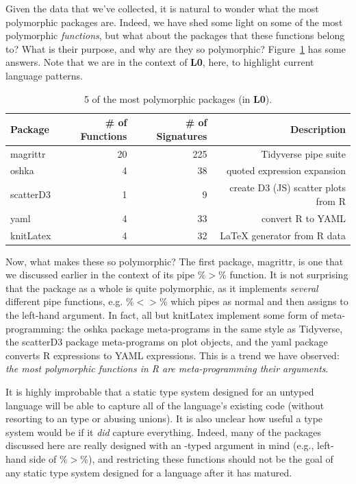 \documentclass[acmsmall,10pt,review,anonymous]{acmart}\settopmatter{printfolios=true,printccs=false,printacmref=false}
\begin{document}
Given the data that we've collected, it is natural to wonder what the most polymorphic packages are.
Indeed, we have shed some light on some of the most polymorphic {\it functions}, but what about the packages that these functions belong to?
What is their purpose, and why are they so polymorphic?
Figure~\ref{tab:packagepolysize} has some answers.
Note that we are in the context of {\bf L0}, here, to highlight current language patterns.

\begin{table}[ht]
\centering
\begin{tabular}{lrrr}
  \hline
  Package & \# of Functions &\# of Signatures & Description \\ 
  \hline
  magrittr & 20 & 225 & Tidyverse pipe suite \\ 
  oshka & 4 & 38 & quoted expression expansion \\ 
  scatterD3 & 1 & 9 & create D3 (JS) scatter plots from R \\ 
  yaml & 4 & 33 & convert R to YAML \\ 
  knitLatex & 4 & 32 & \LaTeX \xspace generator from R data \\ 
   \hline
\end{tabular}
\caption{5 of the most polymorphic packages (in {\bf L0}).}
\label{tab:packagepolysize}
\end{table}

Now, what makes these so polymorphic?
The first package, magrittr, is one that we discussed earlier in the context of its pipe \%$>$\% function. 
It is not surprising that the package as a whole is quite polymorphic, as it implements {\it several} different pipe functions, e.g. \%$<>$\% which pipes as normal and then assigns to the left-hand argument.
In fact, all but knitLatex implement some form of meta-programming:
the oshka package meta-programs in the same style as Tidyverse, the scatterD3 package meta-programs on plot objects, and the yaml package converts R expressions to YAML expressions.
This is a trend we have observed: {\it the most polymorphic functions in R are meta-programming their arguments}.

It is highly improbable that a static type system designed for an untyped language will be able to capture all of the language's existing code (without resorting to an \ANY type or abusing unions).
It is also unclear how useful a type system would be if it {\it did} capture everything.
Indeed, many of the packages discussed here are really designed with an \ANY-typed argument in mind (e.g., left-hand side of \%$>$\%), and restricting these functions should not be the goal of any static type system designed for a language after it has matured.
\end{document}
